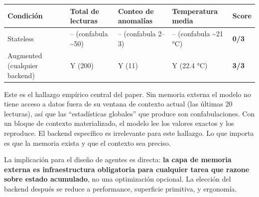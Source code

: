 {\def\LTcaptype{none} %
\begin{longtable}[]{@{}
  >{\raggedright\arraybackslash}p{}
  >{\centering\arraybackslash}p{}
  >{\centering\arraybackslash}p{}
  >{\centering\arraybackslash}p{}
  >{\centering\arraybackslash}p{}@{}}
\toprule\noalign{}
\begin{minipage}[b]{\linewidth}\raggedright
Condición
\end{minipage} & \begin{minipage}[b]{\linewidth}\centering
Total de lecturas
\end{minipage} & \begin{minipage}[b]{\linewidth}\centering
Conteo de anomalías
\end{minipage} & \begin{minipage}[b]{\linewidth}\centering
Temperatura media
\end{minipage} & \begin{minipage}[b]{\linewidth}\centering
Score
\end{minipage} \\
\midrule\noalign{}
\endhead
\bottomrule\noalign{}
\endlastfoot
Stateless & -- (confabula \textasciitilde50) & -- (confabula 2--3) & --
(confabula \textasciitilde21 °C) & \textbf{0/3} \\
Augmented (cualquier backend) & Y (200) & Y (11) & Y (22.4 °C) & \textbf{3/3} \\
\end{longtable}
}

Este es el hallazgo empírico central del paper. Sin memoria externa el modelo no
tiene acceso a datos fuera de su ventana de contexto actual (las últimas 20
lecturas), así que las ``estadísticas globales'' que produce son
confabulaciones. Con un bloque de contexto materializado, el modelo lee los
valores exactos y los reproduce. El backend específico es irrelevante para este
hallazgo. Lo que importa es que la memoria exista y que el contexto sea preciso.

La implicación para el diseño de agentes es directa: \textbf{la capa de memoria
externa es infraestructura obligatoria para cualquier tarea que razone sobre
estado acumulado}, no una optimización opcional. La elección del backend después
se reduce a performance, superficie primitiva, y ergonomía.


